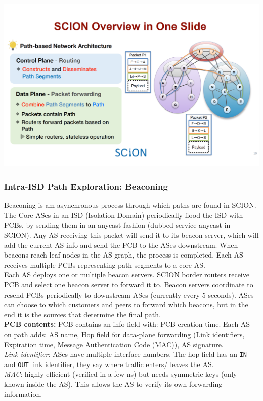 \begin{minipage}{\linewidth}
    \centering      
    \includegraphics[width=\linewidth]{Figures/SCION_overview.PNG} 
\end{minipage}


\subsubsection{Intra-ISD Path Exploration: Beaconing}
Beaconing is am asynchronous process through which paths are found in SCION. The Core ASes in an ISD (Isolation Domain) periodically flood the ISD with PCBs, by sending them in an anycast fashion (dubbed service anycast in SCION). Any AS receiving this packet will send it to its beacon server, which will add the current AS info and send the PCB to the ASes downstream. When beacons reach leaf nodes in the AS graph, the process is completed. Each AS receives multiple PCBs representing path segments to a core AS.\\

Each AS deploys one or multiple beacon servers. SCION border routers receive PCB
and select one beacon server to forward it to. Beacon servers coordinate to resend PCBs periodically to downstream ASes (currently every 5 seconds). ASes can choose to which customers and peers to forward which beacons, but in the end it is the sources that determine the final path.\\

\textbf{PCB contents:} PCB contains an info field with: PCB creation time. Each AS on path adds: AS name, Hop field for data-plane forwarding (Link identifiers, Expiration time, Message Authentication Code (MAC)), AS signature.\\
\textit{Link identifier}: ASes have multiple interface numbers. The hop field has an \texttt{IN} and \texttt{OUT} link identifier, they say where traffic enters/ leaves the AS.\\
\textit{MAC}: highly efficient (verified in a few ns) but needs symmetric keys (only known inside the AS). This allows the AS to verify its own forwarding information.

